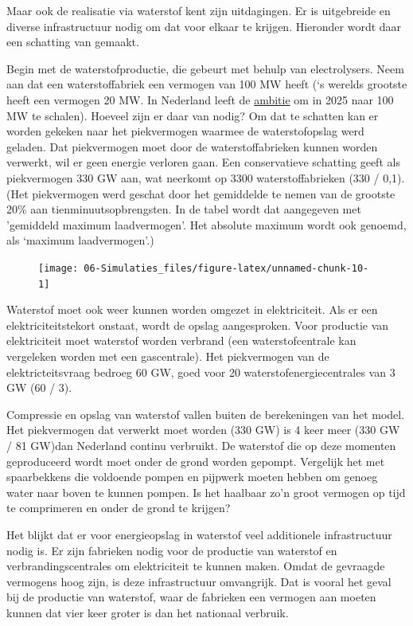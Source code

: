 \documentclass[
  11pt,
  a4paper,
]{book}
\begin{document}
Maar ook de realisatie via waterstof kent zijn uitdagingen. Er is uitgebreide en diverse infrastructuur nodig om dat voor elkaar te krijgen. Hieronder wordt daar een schatting van gemaakt.

Begin met de waterstofproductie, die gebeurt met behulp van electrolysers. Neem aan dat een waterstoffabriek een vermogen van 100 MW heeft (`s werelds grootste heeft een vermogen 20 MW. In Nederland leeft de \href{https://www.technischweekblad.nl/nieuws/uniper-en-haven-overwegen-waterstoffabriek-van-100-mw}{ambitie} om in 2025 naar 100 MW te schalen). Hoeveel zijn er daar van nodig? Om dat te schatten kan er worden gekeken naar het piekvermogen waarmee de waterstofopslag werd geladen. Dat piekvermogen moet door de waterstoffabrieken kunnen worden verwerkt, wil er geen energie verloren gaan. Een conservatieve schatting geeft als piekvermogen 330 GW aan, wat neerkomt op 3300 waterstoffabrieken (330 / 0,1). (Het piekvermogen werd geschat door het gemiddelde te nemen van de grootste 20\% aan tienminuutsopbrengsten. In de tabel wordt dat aangegeven met 'gemiddeld maximum laadvermogen'. Het absolute maximum wordt ook genoemd, als `maximum laadvermogen'.)

\begin{figure}

{\centering \texttt{[image: 06-Simulaties\_files/figure-latex/unnamed-chunk-10-1]} 

}

\end{figure}

Waterstof moet ook weer kunnen worden omgezet in elektriciteit. Als er een elektriciteitstekort onstaat, wordt de opslag aangesproken. Voor productie van elektriciteit moet waterstof worden verbrand (een waterstofcentrale kan vergeleken worden met een gascentrale). Het piekvermogen van de elektricteitsvraag bedroeg 60 GW, goed voor 20 waterstofenergiecentrales van 3 GW (60 / 3).

Compressie en opslag van waterstof vallen buiten de berekeningen van het model. Het piekvermogen dat verwerkt moet worden (330 GW) is 4 keer meer (330 GW / 81 GW)dan Nederland continu verbruikt. De waterstof die op deze momenten geproduceerd wordt moet onder de grond worden gepompt. Vergelijk het met spaarbekkens die voldoende pompen en pijpwerk moeten hebben om genoeg water naar boven te kunnen pompen. Is het haalbaar zo'n groot vermogen op tijd te comprimeren en onder de grond te krijgen?

\bigskip\noindent
Het blijkt dat er voor energieopslag in waterstof veel additionele infrastructuur nodig is. Er zijn fabrieken nodig voor de productie van waterstof en verbrandingscentrales om elektriciteit te kunnen maken. Omdat de gevraagde vermogens hoog zijn, is deze infrastructuur omvangrijk. Dat is vooral het geval bij de productie van waterstof, waar de fabrieken een vermogen aan moeten kunnen dat vier keer groter is dan het nationaal verbruik.
\end{document}
